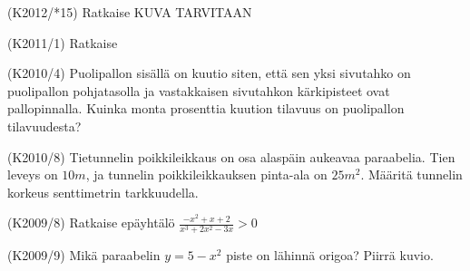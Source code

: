 \begin{tehtava} (K2012/*15) Ratkaise   KUVA TARVITAAN
\begin{alakohdat}
	\end{alakohdat}
\end{tehtava}

\begin{tehtava} (K2011/1) Ratkaise
  \begin{alakohdat}
  \end{alakohdat}
\end{tehtava}

\begin{tehtava}(K2010/4)
Puolipallon sisällä on kuutio siten, että sen yksi sivutahko on puolipallon pohjatasolla ja vastakkaisen sivutahkon kärkipisteet ovat pallopinnalla. Kuinka monta prosenttia kuution tilavuus on puolipallon tilavuudesta?
\end{tehtava}

\begin{tehtava}(K2010/8)
Tietunnelin poikkileikkaus on osa alaspäin aukeavaa paraabelia. Tien leveys on $10 m$, ja tunnelin poikkileikkauksen pinta-ala on $25 m^2$. Määritä tunnelin korkeus senttimetrin tarkkuudella.
\end{tehtava}

\begin{tehtava}(K2009/8)
Ratkaise epäyhtälö
$\frac{-x^2+x+2}{x^3+2x^2-3x}>0$
\end{tehtava}

\begin{tehtava}(K2009/9)
Mikä paraabelin $y=5-x^2$ piste on lähinnä origoa? Piirrä kuvio.
\end{tehtava}



